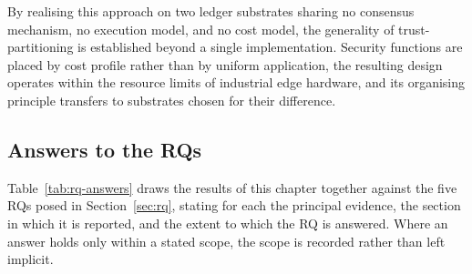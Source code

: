 By realising this approach on two ledger substrates sharing no consensus mechanism, no execution model, and no cost model, the generality of trust-partitioning is established beyond a single implementation. Security functions are placed by cost profile rather than by uniform application, the resulting design operates within the resource limits of industrial edge hardware, and its organising principle transfers to substrates chosen for their difference.

\subsection{Answers to the RQs}
\label{sec:eval-rq}

Table~\ref{tab:rq-answers} draws the results of this chapter together against the five RQs posed in Section~\ref{sec:rq}, stating for each the principal evidence, the section in which it is reported, and the extent to which the RQ is answered. Where an answer holds only within a stated scope, the scope is recorded rather than left implicit.

